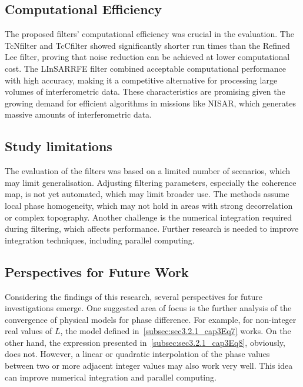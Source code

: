 \documentclass[remotesensing,article,submit,pdftex,moreauthors]{Definitions/mdpi}
\begin{document}
\subsection{Computational Efficiency}

The proposed filters’ computational efficiency was crucial in the evaluation. 
The TcNfilter and TcCfilter showed significantly shorter run times than the Refined Lee filter, proving that noise reduction can be achieved at lower computational cost. 
The LInSARRFE filter combined acceptable computational performance with high accuracy, making it a competitive alternative for processing large volumes of interferometric data. 
These characteristics are promising given the growing demand for efficient algorithms in missions like NISAR, which generates massive amounts of interferometric data.

\subsection{Study limitations}

The evaluation of the filters was based on a limited number of scenarios, which may limit generalisation. 
Adjusting filtering parameters, especially the coherence map, is not yet automated, which may limit broader use. 
The methods assume local phase homogeneity, which may not hold in areas with strong decorrelation or complex topography. 
Another challenge is the numerical integration required during filtering, which affects performance. Further research is needed to improve integration techniques, including parallel computing.

\subsection{Perspectives for Future Work}

Considering the findings of this research, several perspectives for future investigations emerge. One suggested area of focus is the further analysis of the convergence of physical models for phase difference. For example, for non-integer real values of $L$, the model defined in~\eqref{subsec:sec3.2.1_cap3Eq7} works. 
On the other hand, the expression presented in~\eqref{subsec:sec3.2.1_cap3Eq8}, obviously, does not. 
However, a linear or quadratic interpolation of the phase values between two or more adjacent integer values may also work very well. 
This idea can improve numerical integration and parallel computing.

\end{document}
